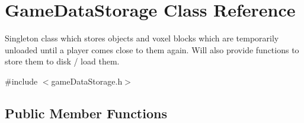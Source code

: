 \hypertarget{classGameDataStorage}{
\section{\-Game\-Data\-Storage \-Class \-Reference}
\label{dc/d0b/classGameDataStorage}
}


\-Singleton class which stores objects and voxel blocks which are temporarily unloaded until a player comes close to them again. \-Will also provide functions to store them to disk / load them.  




{\ttfamily \#include $<$game\-Data\-Storage.\-h$>$}

\subsection*{\-Public \-Member \-Functions}
